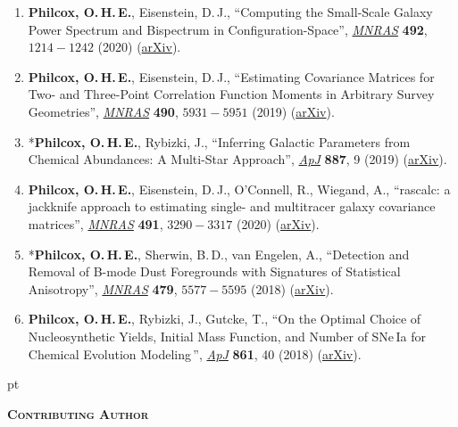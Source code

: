 \begin{enumerate}
    \item \textbf{Philcox, O.\,H.\,E.}, Eisenstein, D.\,J., ``Computing the Small-Scale Galaxy Power Spectrum and Bispectrum in Configuration-Space'', \href{https://doi.org/10.1093/mnras/stz3335}{\textit{MNRAS}} \textbf{492}, $1214-1242$ (2020) (\href{https://arxiv.org/abs/1912.01010}{arXiv}).
    \item \textbf{Philcox, O.\,H.\,E.}, Eisenstein, D.\,J., ``Estimating Covariance Matrices for Two- and Three-Point Correlation Function Moments in Arbitrary Survey Geometries'', \href{https://doi.org/10.1093/mnras/stz2896}{\textit{MNRAS}} \textbf{490}, $5931-5951$ (2019) (\href{https://arxiv.org/abs/1910.04764}{arXiv}).
    \item *\textbf{Philcox, O.\,H.\,E.}, Rybizki, J., ``Inferring Galactic Parameters from Chemical Abundances: A Multi-Star Approach'', \href{https://doi.org/10.3847/1538-4357/ab5186}{\textit{ApJ}} \textbf{887}, 9 (2019) (\href{https://arxiv.org/abs/1909.00812}{arXiv}).
    \item \textbf{Philcox, O.\,H.\,E.}, Eisenstein, D.\,J., O'Connell, R., Wiegand, A., ``rascalc: a jackknife approach to estimating single- and multitracer galaxy covariance matrices'', \href{https://doi.org/10.1093/mnras/stz3218}{\textit{MNRAS}} \textbf{491}, $3290-3317$ (2020) (\href{https://arxiv.org/abs/1904.11070}{arXiv}).
    \item *\textbf{Philcox, O.\,H.\,E.}, Sherwin, B.\,D., van Engelen, A., ``Detection and Removal of B-mode Dust Foregrounds with Signatures of Statistical Anisotropy'', \href{https://doi.org/10.1093/mnras/sty1769}{\textit{MNRAS}} \textbf{479}, $5577-5595$ (2018) (\href{https://arxiv.org/abs/1805.09177}{arXiv}).
\item \textbf{Philcox, O.\,H.\,E.}, Rybizki, J., Gutcke, T., ``On the Optimal Choice of Nucleosynthetic Yields, Initial Mass Function, and Number of SNe\,Ia for Chemical Evolution Modeling\,'', \textit{\href{https://doi.org/10.3847/1538-4357/aac6e4}{ApJ}} \textbf{861}, 40 (2018) (\href{https://arxiv.org/abs/1712.05686}{arXiv}).
\end{enumerate}

 pt 

\textbf{\textsc{Contributing Author}}

